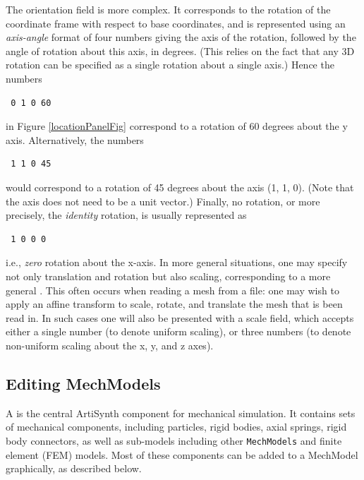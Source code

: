 \documentclass{article}
\begin{document}
The {\sf orientation} field is more complex. It corresponds to the rotation
of the coordinate frame with respect to base coordinates, and is
represented using an {\it axis-angle} format of four numbers giving the
axis of the rotation, followed by the angle of rotation about this
axis, in degrees.  (This relies on the fact that any 3D rotation can
be specified as a single rotation about a single axis.)  Hence the
numbers

\begin{verbatim}
 0 1 0 60
\end{verbatim}

in Figure \ref{locationPanelFig} correspond to a rotation of 60 degrees about
the y axis. Alternatively, the numbers

\begin{verbatim}
 1 1 0 45
\end{verbatim}

would correspond to a rotation of 45 degrees about the axis (1, 1, 0).
(Note that the axis does not need to be a unit vector.)
Finally, no rotation, or more precisely, the {\it identity} rotation,
is usually represented as

\begin{verbatim}
 1 0 0 0
\end{verbatim}

i.e., {\it zero} rotation about the x-axis. In more general situations,
one may specify not only translation and rotation but also scaling,
corresponding to a more general
. This often occurs when
reading a mesh from a file: one may wish to apply an affine transform
to scale, rotate, and translate the mesh that is been read in.  In
such cases one will also be presented with a {\sf scale} field, which
accepts either a single number (to denote uniform scaling), or three
numbers (to denote non-uniform scaling about the x, y, and z axes).

\subsection{Editing MechModels}

A  is the central ArtiSynth
component for mechanical simulation. It contains sets of mechanical
components, including particles, rigid bodies, axial springs, rigid
body connectors, as well as sub-models including other {\tt MechModels}
and finite element (FEM) models. Most of these components can be added to a
MechModel graphically, as described below.
\end{document}

